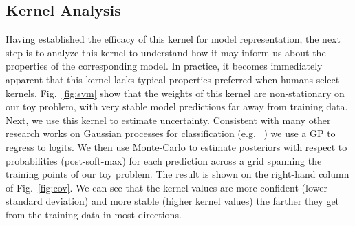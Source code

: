 


\subsection{Kernel Analysis}
Having established the efficacy of this kernel for model representation, the next step is to analyze this kernel to understand how it may inform us about the properties of the corresponding model. In practice, it becomes immediately apparent that this kernel lacks typical properties preferred when humans select kernels. Fig.~\ref{fig:svm} show that the weights of this kernel are non-stationary on our toy problem, with very stable model predictions far away from training data. Next, we use this kernel to estimate uncertainty. Consistent with many other research works on Gaussian processes for classification (e.g. ~\citet{rasmussen2006gaussian}) we use a GP to regress to logits. We then use Monte-Carlo to estimate posteriors with respect to probabilities (post-soft-max) for each prediction across a grid spanning the training points of our toy problem. The result is shown on the right-hand column of Fig.~\ref{fig:cov}. We can see that the kernel values are more confident (lower standard deviation) and more stable (higher kernel values) the farther they get from the training data in most directions. 

